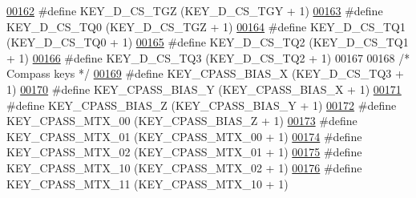 \begin{DoxyCode}
\hypertarget{dmp_key_8h_source.tex_l00162}{}\hyperlink{dmp_key_8h_a01094a31362254939019ae7377499c83}{00162} \textcolor{preprocessor}{#define KEY\_D\_CS\_TGZ                    (KEY\_D\_CS\_TGY + 1)}
\hypertarget{dmp_key_8h_source.tex_l00163}{}\hyperlink{dmp_key_8h_a6153e0a0b75906eb642386010662852d}{00163} \textcolor{preprocessor}{#define KEY\_D\_CS\_TQ0                    (KEY\_D\_CS\_TGZ + 1)}
\hypertarget{dmp_key_8h_source.tex_l00164}{}\hyperlink{dmp_key_8h_a107a6b6fcc3d6b96fc2edb0862bf5862}{00164} \textcolor{preprocessor}{#define KEY\_D\_CS\_TQ1                    (KEY\_D\_CS\_TQ0 + 1)}
\hypertarget{dmp_key_8h_source.tex_l00165}{}\hyperlink{dmp_key_8h_a237f4791eec9ec3105994b251c967d92}{00165} \textcolor{preprocessor}{#define KEY\_D\_CS\_TQ2                    (KEY\_D\_CS\_TQ1 + 1)}
\hypertarget{dmp_key_8h_source.tex_l00166}{}\hyperlink{dmp_key_8h_a11f4cdfb5db8624c11a0cedce6d5ce5a}{00166} \textcolor{preprocessor}{#define KEY\_D\_CS\_TQ3                    (KEY\_D\_CS\_TQ2 + 1)}
00167 
00168 \textcolor{comment}{/* Compass keys */}
\hypertarget{dmp_key_8h_source.tex_l00169}{}\hyperlink{dmp_key_8h_a2da3f36266d9b105a92dc81c7b5961ce}{00169} \textcolor{preprocessor}{#define KEY\_CPASS\_BIAS\_X            (KEY\_D\_CS\_TQ3 + 1)}
\hypertarget{dmp_key_8h_source.tex_l00170}{}\hyperlink{dmp_key_8h_a46b38dc4a2ff0c9b823218316f80ed6f}{00170} \textcolor{preprocessor}{#define KEY\_CPASS\_BIAS\_Y            (KEY\_CPASS\_BIAS\_X + 1)}
\hypertarget{dmp_key_8h_source.tex_l00171}{}\hyperlink{dmp_key_8h_a9b42236436c858d2de49063bc0c2465f}{00171} \textcolor{preprocessor}{#define KEY\_CPASS\_BIAS\_Z            (KEY\_CPASS\_BIAS\_Y + 1)}
\hypertarget{dmp_key_8h_source.tex_l00172}{}\hyperlink{dmp_key_8h_abe89c3a827ff9493140eaa27aef71933}{00172} \textcolor{preprocessor}{#define KEY\_CPASS\_MTX\_00            (KEY\_CPASS\_BIAS\_Z + 1)}
\hypertarget{dmp_key_8h_source.tex_l00173}{}\hyperlink{dmp_key_8h_acfc365e5be51d99a6c34421908dc1861}{00173} \textcolor{preprocessor}{#define KEY\_CPASS\_MTX\_01            (KEY\_CPASS\_MTX\_00 + 1)}
\hypertarget{dmp_key_8h_source.tex_l00174}{}\hyperlink{dmp_key_8h_aa952b7623929bd6bb0b1373ff9834752}{00174} \textcolor{preprocessor}{#define KEY\_CPASS\_MTX\_02            (KEY\_CPASS\_MTX\_01 + 1)}
\hypertarget{dmp_key_8h_source.tex_l00175}{}\hyperlink{dmp_key_8h_a8c65416f2758458dd5fd3a3bd1846813}{00175} \textcolor{preprocessor}{#define KEY\_CPASS\_MTX\_10            (KEY\_CPASS\_MTX\_02 + 1)}
\hypertarget{dmp_key_8h_source.tex_l00176}{}\hyperlink{dmp_key_8h_ad9d4ff38897023052b584c07634e9997}{00176} \textcolor{preprocessor}{#define KEY\_CPASS\_MTX\_11            (KEY\_CPASS\_MTX\_10 + 1)}

\end{DoxyCode}
